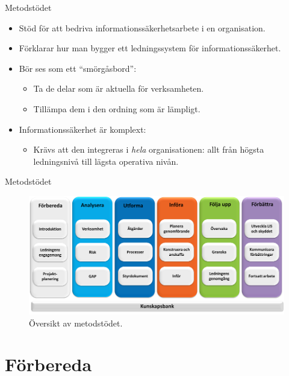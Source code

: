 \documentclass{beamer}
\begin{document}
\begin{frame}{Metodstödet}
  \begin{itemize}
    \item Stöd för att bedriva informationssäkerhetsarbete i en organisation.

    \item Förklarar hur man bygger ett ledningssystem för informationssäkerhet.

    \item Bör ses som ett \enquote{smörgåsbord}:
      \begin{itemize}
        \item Ta de delar som är aktuella för verksamheten.
        \item Tillämpa dem i den ordning som är lämpligt.
      \end{itemize}

    \item Informationssäkerhet är komplext:
      \begin{itemize}
        \item Krävs att den integreras i \emph{hela} organisationen: allt från 
          högsta ledningsnivå till lägsta operativa nivån.
      \end{itemize}

  \end{itemize}
\end{frame}

\begin{frame}{Metodstödet}
  \begin{figure}
    \includegraphics[width=\textwidth]{metodstod-overview.png}
    \caption{Översikt av metodstödet.}
  \end{figure}
\end{frame}


\section{Förbereda}
\end{document}
